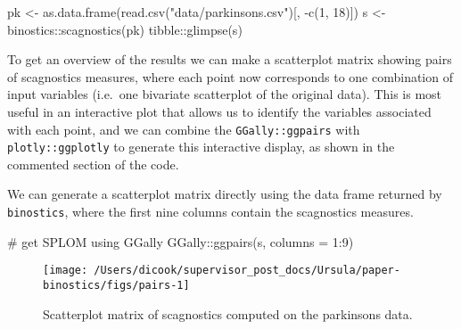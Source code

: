 \begin{Schunk}
\begin{Sinput}
pk <- as.data.frame(read.csv("data/parkinsons.csv")[, -c(1, 18)])
s <- binostics::scagnostics(pk)
tibble::glimpse(s)
\end{Sinput}
\end{Schunk}

To get an overview of the results we can make a scatterplot matrix
showing pairs of scagnostics measures, where each point now corresponds
to one combination of input variables (i.e.~one bivariate scatterplot of
the original data). This is most useful in an interactive plot that
allows us to identify the variables associated with each point, and we
can combine the \texttt{GGally::ggpairs} with \texttt{plotly::ggplotly}
to generate this interactive display, as shown in the commented section
of the code.

We can generate a scatterplot matrix directly using the data frame
returned by \texttt{binostics}, where the first nine columns contain the
scagnostics measures.

\begin{Schunk}
\begin{Sinput}
# get SPLOM using GGally
GGally::ggpairs(s, columns = 1:9)
\end{Sinput}
\begin{figure}

{\centering \texttt{[image: /Users/dicook/supervisor\_post\_docs/Ursula/paper-binostics/figs/pairs-1]} 

}

\caption[Scatterplot matrix of scagnostics computed on the parkinsons data]{Scatterplot matrix of scagnostics computed on the parkinsons data.}\label{fig:pairs}
\end{figure}
\end{Schunk}

